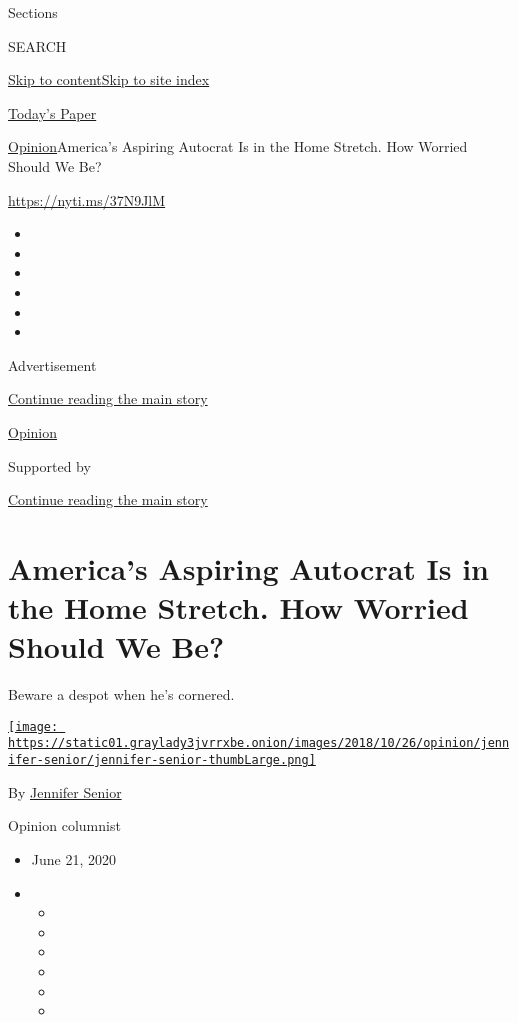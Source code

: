 Sections

SEARCH

\protect\hyperlink{site-content}{Skip to
content}\protect\hyperlink{site-index}{Skip to site index}

\href{https://myaccount.nytimes3xbfgragh.onion/auth/login?response_type=cookie\&client_id=vi}{}

\href{https://www.nytimes3xbfgragh.onion/section/todayspaper}{Today's
Paper}

\href{/section/opinion}{Opinion}\textbar{}America's Aspiring Autocrat Is
in the Home Stretch. How Worried Should We Be?

\url{https://nyti.ms/37N9JlM}

\begin{itemize}
\item
\item
\item
\item
\item
\item
\end{itemize}

Advertisement

\protect\hyperlink{after-top}{Continue reading the main story}

\href{/section/opinion}{Opinion}

Supported by

\protect\hyperlink{after-sponsor}{Continue reading the main story}

\hypertarget{americas-aspiring-autocrat-is-in-the-home-stretch-how-worried-should-we-be}{%
\section{America's Aspiring Autocrat Is in the Home Stretch. How Worried
Should We
Be?}\label{americas-aspiring-autocrat-is-in-the-home-stretch-how-worried-should-we-be}}

Beware a despot when he's cornered.

\href{https://www.nytimes3xbfgragh.onion/by/jennifer-senior}{\texttt{[image: https://static01.graylady3jvrrxbe.onion/images/2018/10/26/opinion/jennifer-senior/jennifer-senior-thumbLarge.png]}}

By \href{https://www.nytimes3xbfgragh.onion/by/jennifer-senior}{Jennifer
Senior}

Opinion columnist

\begin{itemize}
\item
  June 21, 2020
\item
  \begin{itemize}
  \item
  \item
  \item
  \item
  \item
  \item
  \end{itemize}
\end{itemize}

